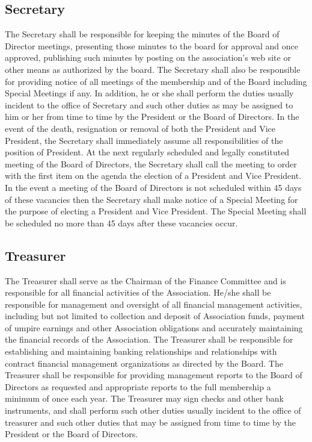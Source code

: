 \documentclass[letterpaper,11pt]{article}
\begin{document}
\subsection{Secretary}
The Secretary shall be responsible for keeping the minutes of the Board of Director meetings, presenting those minutes to the board for approval and once approved, publishing such minutes by posting on the association's web site or other means as authorized by the board. The Secretary shall also be responsible for providing notice of all meetings of the membership and of the Board including Special Meetings if any. In addition, he or she shall perform the duties usually incident to the office of Secretary and such other duties as may be assigned to him or her from time to time by the President or the Board of Directors. In the event of the death, resignation or removal of both the President and Vice President, the Secretary shall immediately assume all responsibilities of the position of President. At the next regularly scheduled and legally constituted meeting of the Board of Directors, the Secretary shall call the meeting to order with the first item on the agenda the election of a President and Vice President. In the event a meeting of the Board of Directors is not scheduled within 45 days of these vacancies then the Secretary shall make notice of a Special Meeting for the purpose of electing a President and Vice President. The Special Meeting shall be scheduled no more than 45 days after these vacancies occur.
\subsection{Treasurer}
The Treasurer shall serve as the Chairman of the Finance Committee and is responsible for all financial activities of the Association. He/she shall be responsible for management and oversight of all financial management activities, including but not limited to collection and deposit of Association funds, payment of umpire earnings and other Association obligations and accurately maintaining the financial records of the Association. The Treasurer shall be responsible for establishing and maintaining banking relationships and relationships with contract financial management organizations as directed by the Board. The Treasurer shall be responsible for providing management reports to the Board of Directors as requested and appropriate reports to the full membership a minimum of once each year. The Treasurer may sign checks and other bank instruments, and shall perform such other duties usually incident to the office of treasurer and such other duties that may be assigned from time to time by the President or the Board of Directors.
\end{document}
